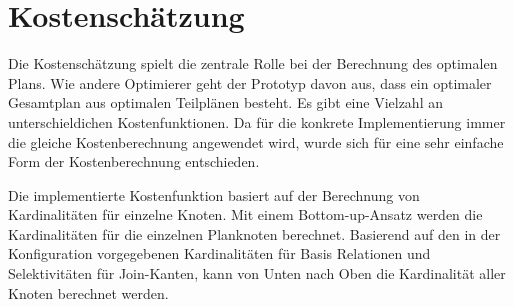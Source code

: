 \section{Kostenschätzung}

Die Kostenschätzung spielt die zentrale Rolle bei der Berechnung des optimalen Plans. Wie andere Optimierer geht der Prototyp davon aus, dass ein optimaler Gesamtplan aus optimalen Teilplänen besteht. Es gibt eine Vielzahl an unterschieldichen Kostenfunktionen. Da für die konkrete Implementierung immer die gleiche Kostenberechnung angewendet wird, wurde sich für eine sehr einfache Form der Kostenberechnung entschieden.

Die implementierte Kostenfunktion basiert auf der Berechnung von Kardinalitäten für einzelne Knoten. Mit einem Bottom-up-Ansatz werden die Kardinalitäten für die einzelnen Planknoten berechnet. Basierend auf den in der Konfiguration vorgegebenen Kardinalitäten für Basis Relationen und Selektivitäten für Join-Kanten, kann von Unten nach Oben die Kardinalität aller Knoten berechnet werden.

